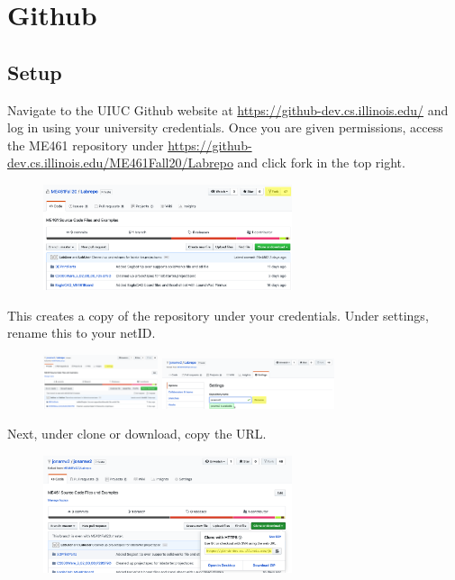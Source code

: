 \documentclass{article}
\begin{document}
\pagebreak

\section{Github}

\subsection{Setup}

Navigate to the UIUC Github website at \url{https://github-dev.cs.illinois.edu/} and log in using your university credentials. Once you are given permissions, access the ME461 repository under \url{https://github-dev.cs.illinois.edu/ME461Fall20/Labrepo} and click fork in the top right.

\begin{figure}[H]
    \centering
  \includegraphics[width = 0.65\textwidth]{github_1.png} 
\end{figure}

This creates a copy of the repository under your credentials. Under settings, rename this to your netID.

\begin{figure}[H]
    \centering
    \includegraphics[width = 0.3\textwidth]{github_2.png} 
    \qquad
    \includegraphics[width = 0.45\textwidth]{github_3.png} 
\end{figure}

Next, under clone or download, copy the URL.

\begin{figure}[H]
    \centering
  \includegraphics[width = 0.65\textwidth]{github_4.png} 
\end{figure}
\end{document}
